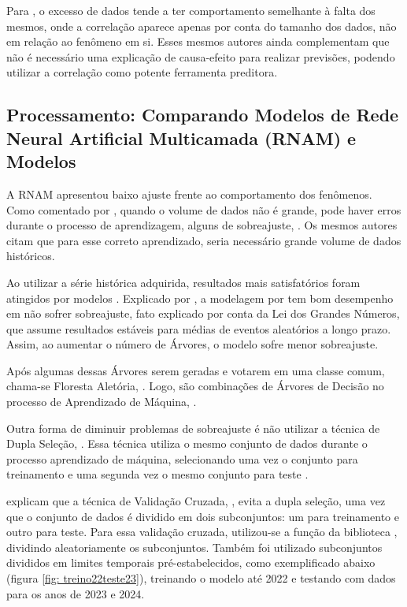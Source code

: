 \indent Para , o excesso de dados tende a ter comportamento semelhante à falta dos mesmos, onde a correlação aparece apenas por conta do tamanho dos dados, não em relação ao fenômeno em si. Esses mesmos autores ainda complementam que não é necessário uma explicação de causa-efeito para realizar previsões, podendo utilizar a correlação como potente ferramenta preditora.

\subsection{Processamento: Comparando Modelos de Rede Neural Artificial Multicamada (RNAM) e Modelos }

\indent A \acrfull{RNAM} apresentou baixo ajuste frente ao comportamento dos fenômenos. Como comentado por , quando o volume de dados não é grande, pode haver erros durante o processo de aprendizagem, alguns de sobreajuste, . Os mesmos autores citam que para esse correto aprendizado, seria necessário grande volume de dados históricos.

\indent Ao utilizar a série histórica adquirida, resultados mais satisfatórios foram atingidos por modelos . Explicado por , a modelagem por  tem bom desempenho em não sofrer sobreajuste, fato explicado por conta da Lei dos Grandes Números, que assume resultados estáveis para médias de eventos aleatórios a longo prazo. Assim, ao aumentar o número de Árvores, o modelo sofre menor sobreajuste.

\indent Após algumas dessas Árvores serem geradas e votarem em uma classe comum, chama-se Floresta Aletória, . Logo,  são combinações de Árvores de Decisão no processo de Aprendizado de Máquina,  \cite{RF2001Breiman}.

\indent Outra forma de diminuir problemas de sobreajuste é não utilizar a técnica de Dupla Seleção, . Essa técnica utiliza o mesmo conjunto de dados durante o processo aprendizado de máquina, selecionando uma vez o conjunto para treinamento e uma segunda vez o mesmo conjunto para teste  \cite{DoubleDippingBall}.

\indent {} explicam que a técnica de Validação Cruzada, , evita a dupla seleção, uma vez que o conjunto de dados é dividido em dois subconjuntos: um para treinamento e outro para teste. Para essa validação cruzada, utilizou-se a função  da biblioteca , dividindo aleatoriamente os subconjuntos. Também foi utilizado subconjuntos divididos em limites temporais pré-estabelecidos, como exemplificado abaixo (figura \ref{fig: treino22teste23}), treinando o modelo até 2022 e testando com dados para os anos de 2023 e 2024.

